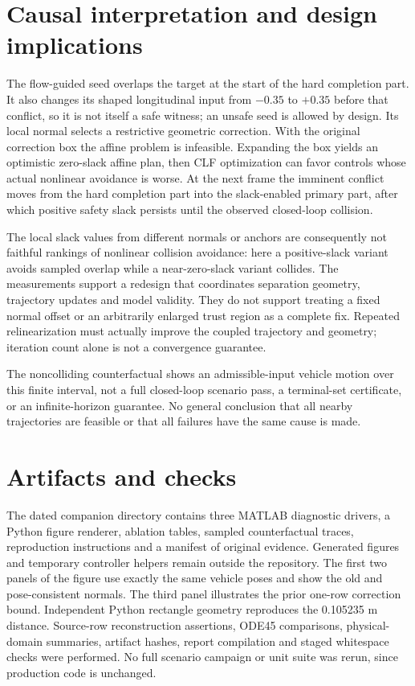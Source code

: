 \documentclass[11pt]{article}
\begin{document}
\section{Causal interpretation and design implications}
The flow-guided seed overlaps the target at the start of the hard completion
part. It also changes its shaped longitudinal input from $-0.35$ to $+0.35$
before that conflict, so it is not itself a safe witness; an unsafe seed is
allowed by design. Its local normal selects a restrictive geometric
correction. With the original correction box the affine problem is
infeasible. Expanding the box yields an optimistic zero-slack affine plan,
then CLF optimization can favor controls whose actual nonlinear avoidance is
worse. At the next frame the imminent conflict moves from the hard completion
part into the slack-enabled primary part, after which positive safety slack
persists until the observed closed-loop collision.

The local slack values from different normals or anchors are consequently
not faithful rankings of nonlinear collision avoidance: here a positive-slack
variant avoids sampled overlap while a near-zero-slack variant collides.
The measurements support a redesign that coordinates separation geometry,
trajectory updates and model validity. They do not support treating a fixed
normal offset or an arbitrarily enlarged trust region as a complete fix.
Repeated relinearization must actually improve the coupled trajectory and
geometry; iteration count alone is not a convergence guarantee.

The noncolliding counterfactual shows an admissible-input vehicle motion over
this finite interval, not a full closed-loop scenario pass, a terminal-set
certificate, or an infinite-horizon guarantee. No general conclusion that
all nearby trajectories are feasible or that all failures have the same
cause is made.

\section{Artifacts and checks}
The dated companion directory contains three MATLAB diagnostic drivers,
a Python figure renderer, ablation tables, sampled counterfactual traces,
reproduction instructions and a manifest of original evidence. Generated
figures and temporary controller helpers remain outside the repository.
The first two panels of the figure use exactly the same vehicle poses and
show the old and pose-consistent normals. The third panel illustrates the
prior one-row correction bound. Independent Python rectangle geometry
reproduces the 0.105235 m distance. Source-row reconstruction assertions,
ODE45 comparisons, physical-domain summaries, artifact hashes, report
compilation and staged whitespace checks were performed. No full scenario
campaign or unit suite was rerun, since production code is unchanged.
\end{document}
